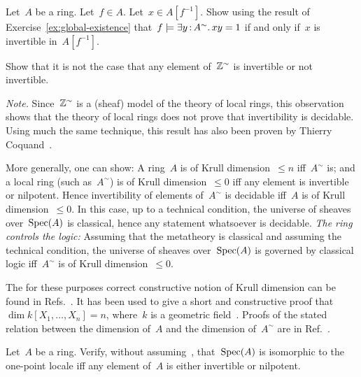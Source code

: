 \documentclass{ws-rv9x6}
\begin{document}
{\begin{exercise}%
Let~$A$ be a ring. Let~$f \in A$. Let~$x \in A[f^{-1}]$. Show using the result
of Exercise~\ref{ex:global-existence} that~$f \models \exists y\,{:}\,A^\sim\mathpunct{.} xy
= 1$ if and only if~$x$ is invertible in~$A[f^{-1}]$.
\end{exercise}

\begin{exercise}%
Show that it is not the case that any element of~$\mathbb{Z}^\sim$ is invertible or
not invertible.\smallskip

{\noindent\scriptsize\emph{Note.} Since~$\mathbb{Z}^\sim$ is a (sheaf) model of the
theory of local rings, this observation shows that the theory of
local rings does not prove that invertibility is decidable. Using much the same
technique, this result has also been proven by Thierry
Coquand~\cite{coquand:local-rings}.

More generally, one can show: A ring~$A$ is of Krull dimension~$\leq n$
iff~$A^\sim$ is; and a local ring (such as~$A^\sim$) is of Krull
dimension~$\leq 0$ iff any element is invertible or nilpotent. Hence
invertibility of elements of~$A^\sim$ is decidable iff~$A$ is of Krull
dimension~$\leq 0$. In this case, up to a technical condition, the universe of
sheaves over~$\mathrm{Spec}(A)$ is classical, hence any statement whatsoever is
decidable. \emph{The ring controls the logic:} Assuming that the metatheory is
classical and assuming the technical condition, the universe of sheaves
over~$\mathrm{Spec}(A)$ is governed by classical logic iff~$A^\sim$ is of Krull
dimension~$\leq 0$.

The for these purposes correct constructive notion of Krull dimension can be
found in Refs.~.
It has been used to give a short and constructive proof that~$\dim
k[X_1,\ldots,X_n] = n$, where~$k$ is a geometric
field~\cite{coquand-lombardi:krull-dim-polynomial-ring}. Proofs of the stated
relation between the dimension of~$A$ and the dimension of~$A^\sim$ are in
Ref.~\cite[Section~3.4]{blechschmidt:phd}.\par}
\end{exercise}

\begin{exercise}%
Let~$A$ be a ring. Verify, without assuming~\BPIT, that~$\mathrm{Spec}(A)$ is
isomorphic to the one-point locale iff any element of~$A$ is either
invertible or nilpotent.\smallskip


\end{exercise}}
\end{document}
